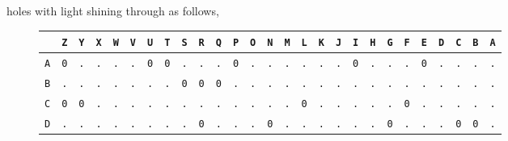 holes with light shining through as follows,
\begin{figure}[H]
  \begin{center}
    \scalebox{0.5} {
      \begin{tabular}{c|cccccccccccccccccccccccccc}
        & \texttt{Z} & \texttt{Y} & \texttt{X} & \texttt{W} &
        \texttt{V} & \texttt{U} & \texttt{T} & \texttt{S} &
        \texttt{R} & \texttt{Q} & \texttt{P} & \texttt{O} &
        \texttt{N} & \texttt{M} & \texttt{L} & \texttt{K} &
        \texttt{J} & \texttt{I} & \texttt{H} & \texttt{G} &
        \texttt{F} & \texttt{E} & \texttt{D} & \texttt{C} &
        \texttt{B} & \texttt{A}
        \\ \hline
        \texttt{A} & \texttt{0} & \texttt{.} & \texttt{.} &
        \texttt{.} & \texttt{.} & \texttt{0} & \texttt{0} &
        \texttt{.} & \texttt{.} & \texttt{.} & \texttt{0} &
        \texttt{.} & \texttt{.} & \texttt{.} & \texttt{.} &
        \texttt{.} & \texttt{.} & \texttt{0} & \texttt{.} &
        \texttt{.} & \texttt{.} & \texttt{0} & \texttt{.} &
        \texttt{.} & \texttt{.} & \texttt{.}                             \\
        \texttt{B} & \texttt{.} & \texttt{.} & \texttt{.} &
        \texttt{.} & \texttt{.} & \texttt{.} & \texttt{.} &
        \texttt{0} & \texttt{0} & \texttt{0} & \texttt{.} &
        \texttt{.} & \texttt{.} & \texttt{.} & \texttt{.} &
        \texttt{.} & \texttt{.} & \texttt{.} & \texttt{.} &
        \texttt{.} & \texttt{.} & \texttt{.} & \texttt{.} &
        \texttt{.} & \texttt{.} & \texttt{.}                             \\
        \texttt{C} & \texttt{0} & \texttt{0} & \texttt{.} &
        \texttt{.} & \texttt{.} & \texttt{.} & \texttt{.} &
        \texttt{.} & \texttt{.} & \texttt{.} & \texttt{.} &
        \texttt{.} & \texttt{.} & \texttt{.} & \texttt{0} &
        \texttt{.} & \texttt{.} & \texttt{.} & \texttt{.} &
        \texttt{.} & \texttt{0} & \texttt{.} & \texttt{.} &
        \texttt{.} & \texttt{.} & \texttt{.}                             \\
        \texttt{D} & \texttt{.} & \texttt{.} & \texttt{.} &
        \texttt{.} & \texttt{.} & \texttt{.} & \texttt{.} &
        \texttt{.} & \texttt{0} & \texttt{.} & \texttt{.} &
        \texttt{.} & \texttt{0} & \texttt{.} & \texttt{.} &
        \texttt{.} & \texttt{.} & \texttt{.} & \texttt{.} &
        \texttt{0} & \texttt{.} & \texttt{.} & \texttt{.} &
        \texttt{0} & \texttt{0} & \texttt{.}                             \\

\end{tabular}}
\end{center}
\end{figure}
